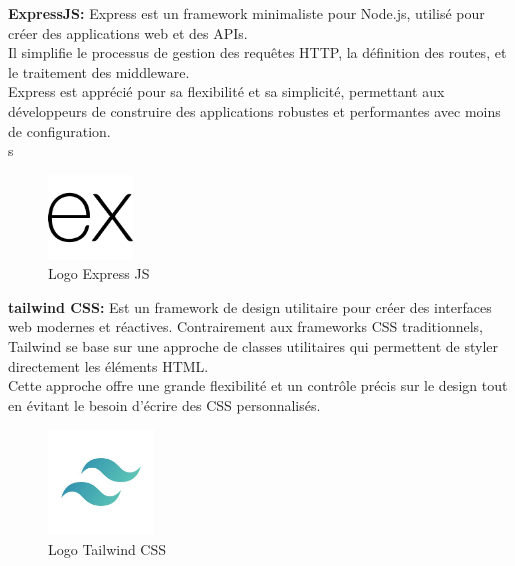  {\bf{ ExpressJS:}}
Express est un framework minimaliste pour Node.js, utilisé pour créer des applications web et des APIs.
\\
Il simplifie le processus de gestion des requêtes HTTP, la définition des routes, et le traitement des middleware.
\\
Express est apprécié pour sa flexibilité et sa simplicité, permettant aux développeurs de construire des applications robustes et performantes avec moins de configuration.
\\s
 \begin{figure}[H]%
    \center%
    \includegraphics[width=0.2\textwidth]{pages/images/expressjs_logo_icon_169185.png}
    \caption{Logo Express JS}\label{fig:test}%
  \end{figure}







 {\bf{ tailwind CSS:}}
Est un framework de design utilitaire pour créer des interfaces web modernes et réactives.
Contrairement aux frameworks CSS traditionnels, Tailwind se base sur une approche de classes utilitaires qui permettent de styler directement les éléments HTML.
\\
Cette approche offre une grande flexibilité et un contrôle précis sur le design tout en évitant le besoin d'écrire des CSS personnalisés.
\begin{figure}[H]%
    \center%
    \includegraphics[width=0.25\textwidth]{pages/images/tailwind.jpg}
    \caption{ Logo Tailwind CSS}\label{fig:test}%
  \end{figure}






